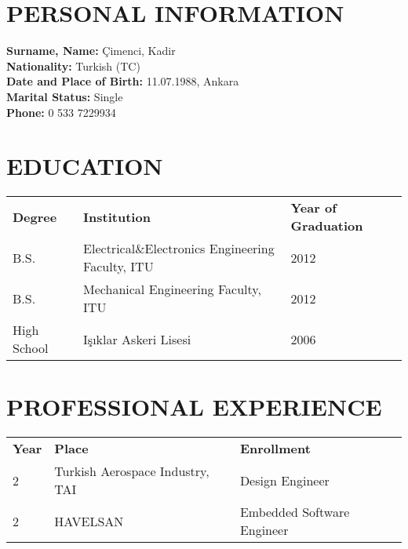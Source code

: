 \curriculumvitae
\label{chapter:vita}

\section*{\uppercase{Personal Information}}

\textbf{Surname, Name: } Çimenci, Kadir\\
\textbf{Nationality:} Turkish (TC) \\
\textbf{Date and Place of Birth:} 11.07.1988, Ankara\\
\textbf{Marital Status:} Single \\
\textbf{Phone:} 0 533 7229934 \\


\section*{\uppercase{Education}}

\begin{tabular}{lll}
\textbf{Degree} & \textbf{Institution} & \textbf{Year of Graduation} \\
B.S. & Electrical$\&$Electronics Engineering Faculty, ITU & 2012 \\
B.S. & Mechanical Engineering Faculty, ITU & 2012 \\
High School & Işıklar Askeri Lisesi & 2006
\end{tabular}

\section*{\uppercase{Professional Experience}}

\begin{tabular}{lll}
\textbf{Year} & \textbf{Place} & \textbf{Enrollment} \\
2 & Turkish Aerospace Industry, TAI & Design Engineer \\
2 & HAVELSAN & Embedded Software Engineer
\end{tabular}

